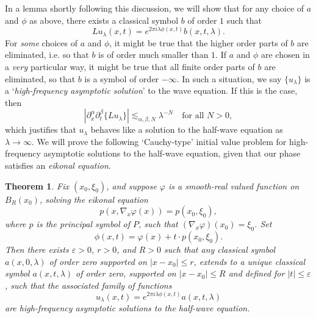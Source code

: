 \documentclass{article}
\theoremstyle{plain}
\newtheorem{theorem}{Theorem}
\theoremstyle{remark}
\theoremstyle{definition}
\begin{document}
%
%
%

In a lemma shortly following this discussion, we will show that for any choice of $a$ and $\phi$ as above, there exists a classical symbol $b$ of order $1$ such that
%
\[ L u_\lambda(x,t) = e^{2 \pi i \lambda \phi(x,t)} b(x,t,\lambda). \]
%
For \emph{some} choices of $a$ and $\phi$, it might be true that the higher order parts of $b$ are eliminated, i.e. so that $b$ is of order much smaller than $1$. If $a$ and $\phi$ are chosen in a \emph{very} particular way, it might be true that all finite order parts of $b$ are eliminated, so that $b$ is a symbol of order $-\infty$. In such a situation, we say $\{ u_\lambda \}$ is a `\emph{high-frequency asymptotic solution}' to the wave equation. If this is the case, then
%
\[ |\partial_x^\alpha \partial_t^\beta \{ L u_\lambda \}| \lesssim_{\alpha,\beta,N} \lambda^{-N} \quad\text{for all $N > 0$}, \]
which justifies that $u_\lambda$ behaves like a solution to the half-wave equation as $\lambda \to \infty$. We will prove the following `Cauchy-type' initial value problem for high-frequency asymptotic solutions to the half-wave equation, given that our phase satisfies an \emph{eikonal equation}.

\begin{theorem}
	Fix $(x_0,\xi_0)$, and suppose $\varphi$ is a smooth-real valued function on $B_R(x_0)$, solving the eikonal equation
	\[ p(x, \nabla_x \varphi(x) ) = p(x_0,\xi_0), \]
	where $p$ is the principal symbol of $P$, such that $(\nabla_x \varphi)(x_0) = \xi_0$. Set
	\[ \phi(x,t) = \varphi(x) + t \cdot p(x_0,\xi_0). \]
	Then there exists $\varepsilon > 0$, $r > 0$, and $R > 0$ such that any classical symbol $a(x,0,\lambda)$ of order zero supported on $|x - x_0| \leq r$, extends to a unique classical symbol $a(x,t,\lambda)$ of order zero, supported on $|x - x_0| \leq R$ and defined for $|t| \leq \varepsilon$, such that the associated family of functions
	\[ u_\lambda(x,t) = e^{2 \pi i \lambda \phi(x,t)} a(x,t,\lambda) \]
	are high-frequency asymptotic solutions to the half-wave equation.
\end{theorem}
\end{document}
